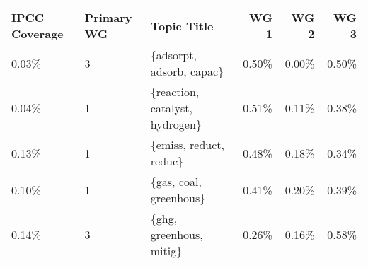 \begin{tabular}{p{1.4cm} p{1cm} l r r r}
\toprule
 IPCC Coverage &  Primary WG &                     Topic Title &  WG 1 &  WG 2 &  WG 3 \\
\midrule
         0.03\% &           3 &        \{adsorpt, adsorb, capac\} & 0.50\% & 0.00\% & 0.50\% \\
         0.04\% &           1 &  \{reaction, catalyst, hydrogen\} & 0.51\% & 0.11\% & 0.38\% \\
         0.13\% &           1 &          \{emiss, reduct, reduc\} & 0.48\% & 0.18\% & 0.34\% \\
         0.10\% &           1 &          \{gas, coal, greenhous\} & 0.41\% & 0.20\% & 0.39\% \\
         0.14\% &           3 &         \{ghg, greenhous, mitig\} & 0.26\% & 0.16\% & 0.58\% \\
\bottomrule
\end{tabular}

